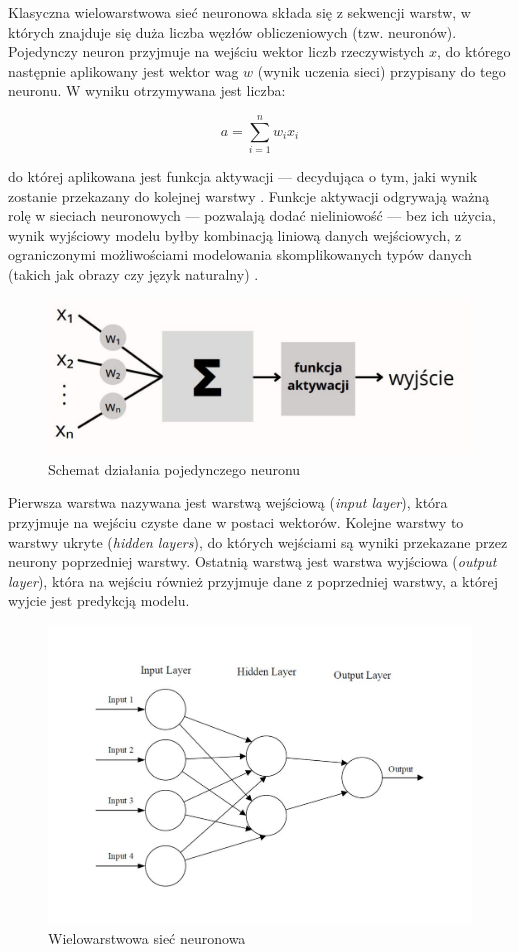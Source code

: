 Klasyczna wielowarstwowa sieć neuronowa składa się z sekwencji warstw, w których znajduje się duża liczba węzłów obliczeniowych (tzw. neuronów). Pojedynczy neuron przyjmuje na wejściu wektor liczb rzeczywistych $x$, do którego następnie aplikowany jest wektor wag $w$ (wynik uczenia sieci) przypisany do tego neuronu.
W wyniku otrzymywana jest liczba:

\begin{equation}
a = \sum_{i=1}^n w_i x_i
\end{equation}

\noindent do której aplikowana jest funkcja aktywacji --- decydująca o tym, jaki wynik zostanie przekazany do kolejnej warstwy \cite{gurney2013introduction}. Funkcje aktywacji odgrywają ważną rolę w sieciach neuronowych --- pozwalają dodać nieliniowość --- bez ich użycia, wynik wyjściowy modelu byłby kombinacją liniową danych wejściowych, z ograniczonymi możliwościami modelowania skomplikowanych typów danych (takich jak obrazy czy język naturalny) \cite{sharma2017activation}.  

\begin{figure}[H]
	\centering
	\includegraphics[width=0.6\linewidth]{images/chapter2/perceptron.pdf}
	\caption{Schemat działania pojedynczego neuronu}
	\label{fig:perceptron}
\end{figure}

\noindent Pierwsza warstwa nazywana jest warstwą wejściową (\textit{input layer}), która przyjmuje na wejściu czyste dane w postaci wektorów. Kolejne warstwy to warstwy ukryte (\textit{hidden layers}), do których wejściami są wyniki przekazane przez neurony poprzedniej warstwy. Ostatnią warstwą jest warstwa wyjściowa (\textit{output layer}), która na wejściu również przyjmuje dane z poprzedniej warstwy, a której wyjcie jest predykcją modelu.

\begin{figure}[H]
	\centering
	\includegraphics[width=0.9\linewidth]{images/chapter2/ann-layers.pdf}
	\caption{Wielowarstwowa sieć neuronowa \cite{o2015introduction}}
	\label{fig:ann-layer}
\end{figure}

